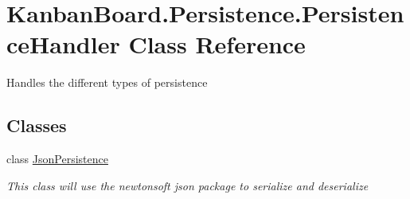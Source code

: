\hypertarget{class_kanban_board_1_1_persistence_1_1_persistence_handler}{}\section{Kanban\+Board.\+Persistence.\+Persistence\+Handler Class Reference}
\label{class_kanban_board_1_1_persistence_1_1_persistence_handler}


Handles the different types of persistence  


\subsection*{Classes}
\begin{DoxyCompactItemize}
\item 
class \hyperlink{class_kanban_board_1_1_persistence_1_1_persistence_handler_1_1_json_persistence}{Json\+Persistence}
\begin{DoxyCompactList}\small\item\em This class will use the newtonsoft json package to serialize and deserialize \end{DoxyCompactList}\end{DoxyCompactItemize}
